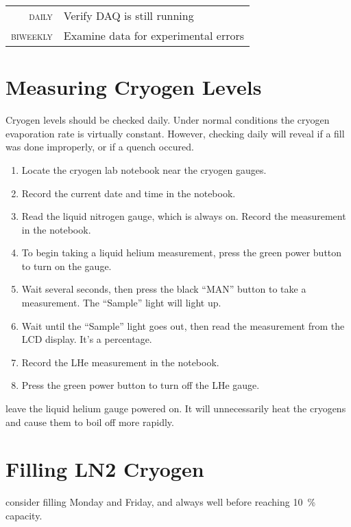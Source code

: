 \begin{table}[h]\begin{tabular}{>{\scshape}r p{\textwidth}}
    daily & Verify DAQ is still running\\
    biweekly & Examine data for experimental errors
\end{tabular}\end{table}

\section{Measuring Cryogen Levels}
\label{sec:op_maintenance:cryogen_levels}

Cryogen levels should be checked daily.  Under normal conditions the cryogen evaporation rate is virtually constant.  However, checking daily will reveal if a fill was done improperly, or if a \gls{quench} occured.  

\begin{enumerate}
\item Locate the cryogen lab notebook near the cryogen gauges.
\item Record the current date and time in the notebook.
\item Read the liquid nitrogen gauge, which is always on.  Record the measurement in the notebook.
\item To begin taking a liquid helium measurement, press the green power button to turn on the gauge.
\item Wait several seconds, then press the black ``MAN'' button to take a measurement.  The ``Sample'' light will light up.
\item Wait until the ``Sample'' light goes out, then read the measurement from the LCD display.  It's a percentage.
\item Record the LHe measurement in the notebook.
\item Press the green power button to turn off the LHe gauge.
\end{enumerate}

\begin{pleasedonot}
  leave the liquid helium gauge powered on.  It will unnecessarily heat the cryogens and cause them to boil off more rapidly.
\end{pleasedonot}

\section{Filling LN2 Cryogen}
\label{sec:op_maintenance:filling_ln2}
\begin{pleasedo} consider filling Monday and Friday, and always well before reaching 10~\% capacity. \end{pleasedo}


